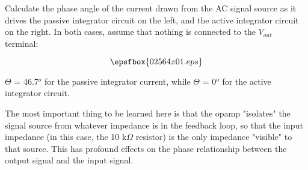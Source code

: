 

Calculate the phase angle of the current drawn from the AC signal source as it drives the passive integrator circuit on the left, and the active integrator circuit on the right.  In both cases, assume that nothing is connected to the $V_{out}$ terminal:

$$\epsfbox{02564x01.eps}$$







$\Theta$ = 46.7$^{o}$ for the passive integrator current, while $\Theta$ = 0$^{o}$ for the active integrator circuit.







The most important thing to be learned here is that the opamp "isolates" the signal source from whatever impedance is in the feedback loop, so that the input impedance (in this case, the 10 k$\Omega$ resistor) is the only impedance "visible" to that source.  This has profound effects on the phase relationship between the output signal and the input signal.




